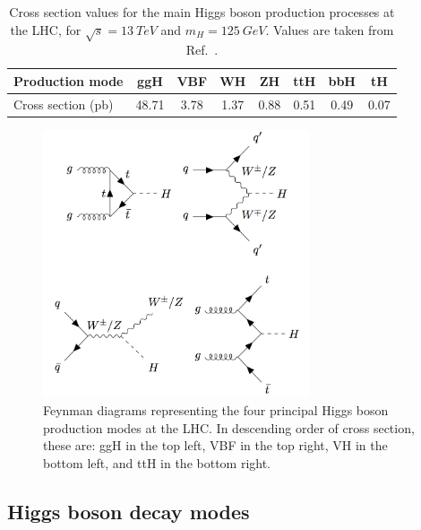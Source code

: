 \begin{table}
  \centering
  \begin{tabular}{ l | c c c c c c c }
      \hline
      Production mode & ggH & VBF & WH & ZH & ttH & bbH & tH  \\
      \hline
      Cross section (pb) & 48.71 & 3.78 & 1.37 & 0.88 & 0.51 & 0.49 & 0.07 \\
      \hline
  \end{tabular}%
  \caption{
  Cross section values for the main Higgs boson production processes at the LHC, 
  for $\sqrt{s}=\SI{13}{TeV}$ and $m_H = \SI{125}{GeV}$.
  Values are taken from Ref.~\cite{YR4}.
  }
  \label{tab:theory_prod}
\end{table}

\begin{figure}[hptb]
  \centering
  \includegraphics[width=0.7\textwidth]{Figures/Theory/FeynProd.png}
  \caption[Feynman diagrams of four Higgs boson production modes.]
  {
    Feynman diagrams representing the four principal Higgs boson production modes at the LHC.
    In descending order of cross section, these are: ggH in the top left, VBF in the top right, 
    VH in the bottom left, and ttH in the bottom right.
  }
  \label{fig:theory_FeynProd}
\end{figure}

\subsection{Higgs boson decay modes}

